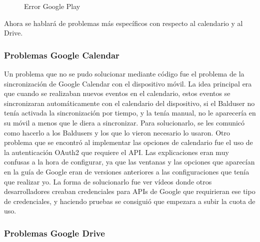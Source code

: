 \begin{figure}[H] 
  \begin{center} 
    \caption{Error Google Play} 
    \label{fig:ErrorGoogle} 
  \end{center} 
\end{figure}

Ahora se hablará de problemas más específicos con respecto al calendario y al Drive.

\subsubsection{Problemas Google Calendar}
\label{subsubsecc:Problemas Google Calendar}

Un problema que no se pudo solucionar mediante código fue el problema de la sincronización de Google Calendar con el dispositivo móvil. La idea principal era que cuando se realizaban nuevos eventos en el calendario, estos eventos se sincronizaran automáticamente con el calendario del dispositivo, si el Balduser no tenía activada la sincronización por tiempo, y la tenía manual, no le aparecería en su móvil a menos que le diera a sincronizar.
Para solucionarlo, se les comunicó como hacerlo a los Baldusers y los que lo vieron necesario lo usaron.
Otro problema que se encontró al implementar las opciones de calendario fue el uso de la autenticación OAuth2 \cite{Oauth} que requiere el API.
Las explicaciones eran muy confusas a la hora de configurar, ya que las ventanas y las opciones que aparecían en la guía de Google eran de versiones anteriores a las configuraciones que tenía que realizar yo.
La forma de solucionarlo fue ver vídeos donde otros desarrolladores creaban credenciales para APIs de Google que requirieran ese tipo de credenciales, y haciendo pruebas se consiguió que empezara a subir la cuota de uso.


\subsubsection{Problemas Google Drive}
\label{subsubsecc:Problemas Google Drive}

